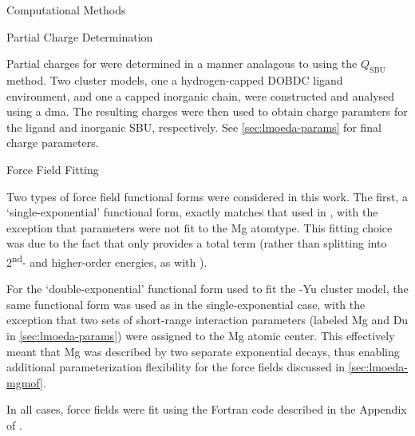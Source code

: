 \begin{section}{Computational Methods}
\label{sec:lmoeda-methods}

\begin{subsection}{Partial Charge Determination}

Partial charges for \mgmof were determined in a manner analagous to
 using the $Q_{\text{SBU}}$ method. Two cluster models, one
a hydrogen-capped DOBDC ligand environment, and one a capped  inorganic chain,
were constructed and analysed using a \acrfull{dma}. The resulting \dma charges were
then used to obtain charge paramters for the ligand and inorganic SBU,
respectively. See \cref{sec:lmoeda-params} for final charge parameters.

\end{subsection}
\begin{subsection}{Force Field Fitting}

Two types of force field functional forms were considered in this work. The
first, a `single-exponential' functional form, exactly matches that used in
, with the exception that \dhf parameters were not fit to
the Mg atomtype. This fitting choice was due to the fact that \lmoeda only provides a
total \induction term (rather than splitting into 2\textsuperscript{nd}- and
higher-order \induction energies, as with \sapt). 

For the `double-exponential' functional form used to fit the \mgmof-Yu cluster
model, the same functional form was used as in the single-exponential case,
with the exception that two sets of short-range interaction parameters
(labeled Mg and Du in \cref{sec:lmoeda-params}) were assigned to the Mg atomic center. This
effectively meant that Mg was described by two separate exponential decays,
thus enabling additional parameterization flexibility for the force fields discussed in
\cref{sec:lmoeda-mgmof}.

In all cases, force fields were fit using the Fortran code described in the
Appendix of .


\end{subsection}




\end{section}
